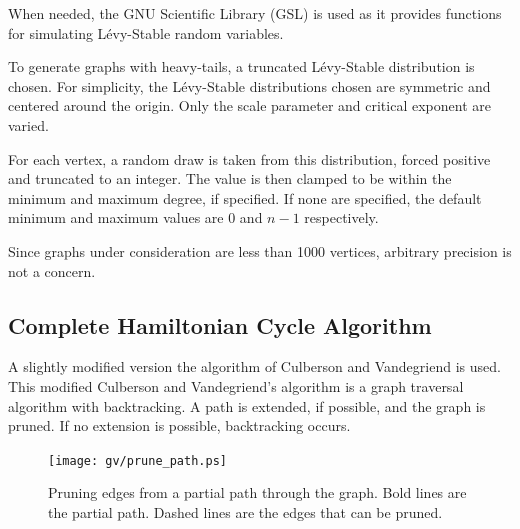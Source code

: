 \documentclass[twoside,11pt]{article}
\begin{document}
When needed, the GNU Scientific Library (GSL) is used as it
provides functions for simulating L\'evy-Stable random variables.



To generate graphs with heavy-tails, a truncated L\'evy-Stable distribution is chosen.  For simplicity, the L\'evy-Stable
distributions chosen are symmetric and centered around the origin.  Only the scale parameter
and critical exponent are varied.

For each vertex, a random draw is taken from this distribution, forced positive and truncated to an integer.
The value is then clamped to be within the minimum and maximum degree, if specified.  If none are specified, the
default minimum and maximum values are 0 and $n-1$ respectively.  


Since graphs under consideration
are less than 1000 vertices, arbitrary precision is not a concern.

\subsection{Complete Hamiltonian Cycle Algorithm}

A slightly modified version the algorithm of Culberson and Vandegriend \citeyear{vandegriend}
is used.  This modified Culberson and Vandegriend's algorithm is
a graph traversal algorithm with backtracking.  A path is extended, if possible, and the graph is pruned.  If
no extension is possible, backtracking occurs.

\begin{figure}
\centering
\texttt{[image: gv/prune\_path.ps]}
\caption{ Pruning edges from a partial path through the graph.  Bold lines are the partial path.  Dashed lines are the
edges that can be pruned. }
\label{fig:prune_path}
\end{figure}
\end{document}

